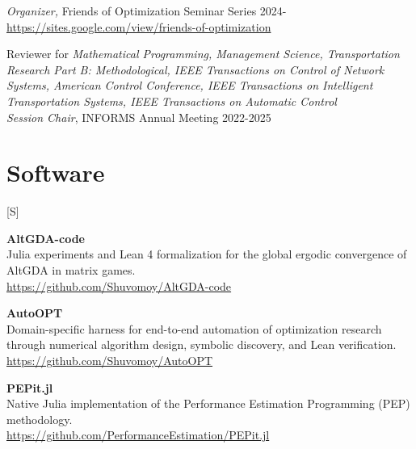 \documentclass[margin,line,pifont]{./FontsAndCls/custom_res}
\newcounter{publication}
\newlength{\publicationitemsep}
\newenvironment{publicationlist}[1]{%
  \setlength{\publicationitemsep}{\parskip}%
  \begin{list}{[#1\arabic{publication}]}{%
    \usecounter{publication}%
    \setlength{\labelwidth}{2.5em}%
    \setlength{\labelsep}{0.5em}%
    \setlength{\leftmargin}{\dimexpr\labelwidth+\labelsep\relax}%
    \setlength{\rightmargin}{0pt}%
    \setlength{\itemindent}{0pt}%
    \setlength{\listparindent}{0pt}%
    \setlength{\itemsep}{\publicationitemsep}%
    \setlength{\parsep}{0pt}%
    \setlength{\topsep}{0pt}%
    \setlength{\partopsep}{0pt}%
    \renewcommand{\makelabel}[1]{\hfil\normalfont ##1}%
  }%
}{\end{list}}
\begin{document}
\begin{resume}
\begin{minipage}{\textwidth}
\noindent \begin{minipage} {\textwidth}
\textit{Organizer, } Friends of Optimization Seminar Series \hfill 2024- \\
{} \url{https://sites.google.com/view/friends-of-optimization} \\
\end{minipage}



Reviewer for \textit{Mathematical Programming, Management Science, Transportation Research Part B: Methodological, IEEE Transactions on Control of Network Systems, American Control Conference, IEEE Transactions on Intelligent Transportation Systems, IEEE Transactions on Automatic Control}  \\

\textit{Session Chair}, INFORMS Annual Meeting \hfill 2022-2025


\end{minipage}




\section{\sc Software}

\begin{publicationlist}{S}

\item \begin{minipage}[t]{\linewidth}
\textbf{AltGDA-code} \\
Julia experiments and Lean 4 formalization for the global ergodic convergence of AltGDA in matrix games. \\
{} \url{https://github.com/Shuvomoy/AltGDA-code}
\end{minipage}

\item \begin{minipage}[t]{\linewidth}
\textbf{AutoOPT} \\
Domain-specific harness for end-to-end automation of optimization research through numerical algorithm design, symbolic discovery, and Lean verification. \\
{} \url{https://github.com/Shuvomoy/AutoOPT}
\end{minipage}

\item \begin{minipage}[t]{\linewidth}
\textbf{PEPit.jl} \\
 Native Julia implementation of the Performance Estimation Programming (PEP) methodology. \\
{} \url{https://github.com/PerformanceEstimation/PEPit.jl}
\end{minipage}


\end{publicationlist}
\end{resume}
\end{document}

